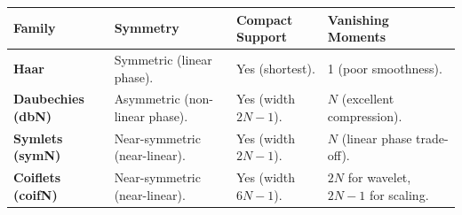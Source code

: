 \documentclass[12pt,a4paper]{article}
\renewcommand{\arraystretch}{1.45}
\begin{document}
\begin{tcolorbox}[tikzbox, title={\textbf{Summary Comparison of Wavelet Families}}]
\par\noindent
{\renewcommand{\arraystretch}{1.4}%
\begin{tabularx}{\linewidth}{|B{3.0cm}|Y|Y|Y|}
\hline
\textbf{Family} & \textbf{Symmetry} & \textbf{Compact Support} & \textbf{Vanishing Moments} \\
\hline
\textbf{Haar} & Symmetric (linear phase). & Yes (shortest). & 1 (poor smoothness). \\
\hline
\textbf{Daubechies (dbN)} & Asymmetric (non-linear phase). & Yes (width $2N-1$). & $N$ (excellent compression). \\
\hline
\textbf{Symlets (symN)} & Near-symmetric (near-linear). & Yes (width $2N-1$). & $N$ (linear phase trade-off). \\
\hline
\textbf{Coiflets (coifN)} & Near-symmetric (near-linear). & Yes (width $6N-1$). & $2N$ for wavelet, $2N-1$ for scaling. \\
\hline
\end{tabularx}}
\end{tcolorbox}
\end{document}
